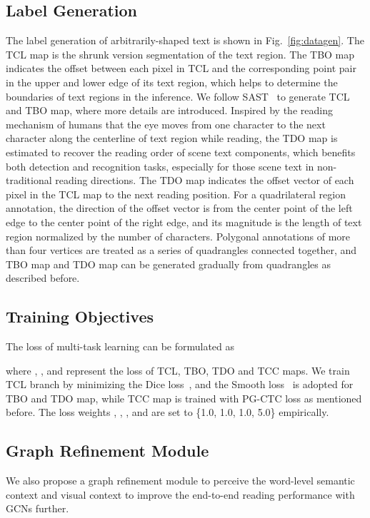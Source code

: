 \documentclass[letterpaper]{article} \usepackage{aaai21}  \usepackage{times}  \usepackage{helvet} \usepackage{courier}  \usepackage[hyphens]{url}  \usepackage{graphicx} \urlstyle{rm} \def\UrlFont{\rm}  \usepackage{natbib}  \usepackage{caption} \usepackage{bm}
\begin{document}
\subsection{Label Generation}
The label generation of arbitrarily-shaped text is shown in Fig.~\ref{fig:datagen}. The TCL map is the shrunk version segmentation of the text region. The TBO map indicates the offset between each pixel in TCL and the corresponding point pair in the upper and lower edge of its text region, which helps to determine the boundaries of text regions in the inference. We follow SAST~\cite{wang2019single} to generate TCL and TBO map, where more details are introduced. Inspired by the reading mechanism of humans that the eye moves from one character to the next character along the centerline of text region while reading, the TDO map is estimated to recover the reading order of scene text components, which benefits both detection and recognition tasks, especially for those scene text in non-traditional reading directions. The TDO map indicates the offset vector of each pixel in the TCL map to the next reading position. For a quadrilateral region annotation, the direction of the offset vector is from the center point of the left edge to the center point of the right edge, and its magnitude is the length of text region normalized by the number of characters. Polygonal annotations of more than four vertices are treated as a series of quadrangles connected together, and TBO map and TDO map can be generated gradually from quadrangles as described before.

\subsection{Training Objectives}
The loss of multi-task learning can be formulated as

where , ,  and  represent the loss of TCL, TBO, TDO and TCC maps. We train TCL branch by minimizing the Dice loss~\cite{milletari2016v}, and the Smooth  loss~\cite{fastrcnn} is adopted for TBO and TDO map, while TCC map is trained with PG-CTC loss as mentioned before. The loss weights , , , and  are set to \{1.0, 1.0, 1.0, 5.0\} empirically.


\subsection{Graph Refinement Module}
We also propose a graph refinement module to perceive the word-level semantic context and visual context to improve the end-to-end reading performance with GCNs further. 
\end{document}
